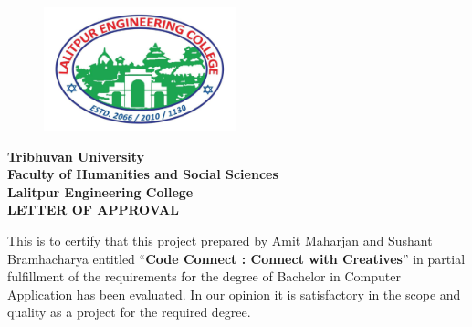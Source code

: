 \begin{figure}
    \centering
    \includegraphics[width=2.2in]{img/Graphics/lec.jpg}
\end{figure}
\begin{center}
    {\fontsize{14pt}{18}\selectfont
    \textbf{Tribhuvan University\\
    Faculty of Humanities and Social Sciences\\
    Lalitpur Engineering College\\
    \vspace{0.2in}
    LETTER OF APPROVAL\\}
    }
\end{center}
This is to certify that this project prepared by Amit Maharjan and Sushant Bramhacharya entitled “\textbf{Code Connect :  Connect with Creatives}” in partial fulfillment of the requirements for the degree of Bachelor in Computer Application has been evaluated. In our opinion it is satisfactory in the
scope and quality as a project for the required degree.\\
